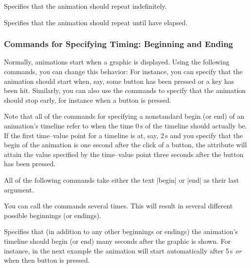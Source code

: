 \begin{command}{\pgfsys@animation@repeat@indefinite}
  Specifies that the animation should repeat indefinitely.
\begin{codeexample}[width=2cm]
\end{codeexample}
\end{command}

\begin{command}{\pgfsys@animation@repeat@dur{}}
  Specifies that the animation should repeat until  have
  elapsed. 
\begin{codeexample}[width=2cm]
\end{codeexample}
\end{command}




\subsubsection{Commands for Specifying Timing: Beginning and Ending}

Normally, animations start when a graphic is displayed. Using the
following commands, you can change this behavior: For instance, you
can specify that the animation should start when, say, some button has
been pressed or a key has been hit. Similarly, you can also use the
commands to specify that the animation should stop early, for instance
when a button is pressed.

Note that all of the commands for specifying a nonstandard begin (or
end) of an animation's timeline refer to when the time $0\,\mathrm s$
of the timeline should actually be. If the first time--value point for
a timeline is at, say, 2\,s and you specify that the begin of the
animation is one second after the click of a button, the attribute
will attain the value specified by the time--value point three seconds
after the button has been pressed.

All of the following commands take either the text |begin| or |end| as
their last argument.

You can call the commands several times. This will result in several
different possible beginnings (or endings).

\begin{command}{\pgfsys@animation@offset{}}
  Specifies that (in addition to any other beginnings or endings) the
  animation's timeline should begin (or end)  many
  seconds after the graphic is shown. For instance, in the next
  example the animation will start automatically after 5\,s \emph{or}
  when then button is pressed.
\begin{codeexample}[width=2cm]
\end{codeexample}
\end{command}

